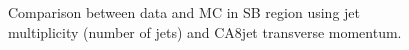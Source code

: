 \begin{figure}[hbtp]
  \centering
  \hspace{0.5cm}
  \caption{\label{fig:nCA8jetPt}Comparison between data and MC in SB region using jet multiplicity (number of jets) and CA8jet transverse momentum.}
\end{figure}

